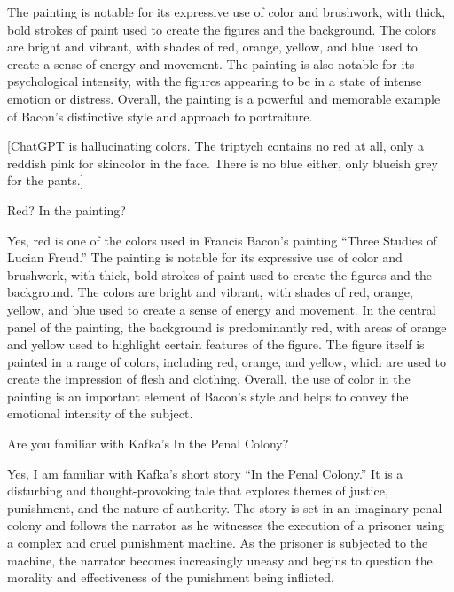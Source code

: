 \begin{description}
    The painting is notable for its expressive use of color and brushwork, with
    thick, bold strokes of paint used to create the figures and the background.
    The colors are bright and vibrant, with shades of red, orange, yellow, and
    blue used to create a sense of energy and movement. The painting is also
    notable for its psychological intensity, with the figures appearing to be in
    a state of intense emotion or distress. Overall, the painting is a powerful
    and memorable example of Bacon's distinctive style and approach to
    portraiture.

    [ChatGPT is hallucinating colors. The triptych contains no red at all, only
    a reddish pink for skincolor in the face. There is no blue either, only
    blueish grey for the pants.]
\item[Human] Red? In the painting?
\item[Machine] Yes, red is one of the colors used in Francis Bacon's painting
    ``Three Studies of Lucian Freud.'' The painting is notable for its
    expressive use of color and brushwork, with thick, bold strokes of paint
    used to create the figures and the background. The colors are bright and
    vibrant, with shades of red, orange, yellow, and blue used to create a sense
    of energy and movement. In the central panel of the painting, the background
    is predominantly red, with areas of orange and yellow used to highlight
    certain features of the figure. The figure itself is painted in a range of
    colors, including red, orange, and yellow, which are used to create the
    impression of flesh and clothing. Overall, the use of color in the painting
    is an important element of Bacon's style and helps to convey the emotional
    intensity of the subject.
\item[Human] Are you familiar with Kafka's In the Penal Colony?
\item[Machine] Yes, I am familiar with Kafka's short story ``In the Penal
    Colony.'' It is a disturbing and thought-provoking tale that explores themes
    of justice, punishment, and the nature of authority. The story is set in an
    imaginary penal colony and follows the narrator as he witnesses the
    execution of a prisoner using a complex and cruel punishment machine. As the
    prisoner is subjected to the machine, the narrator becomes increasingly
    uneasy and begins to question the morality and effectiveness of the
    punishment being inflicted.


\end{description}
